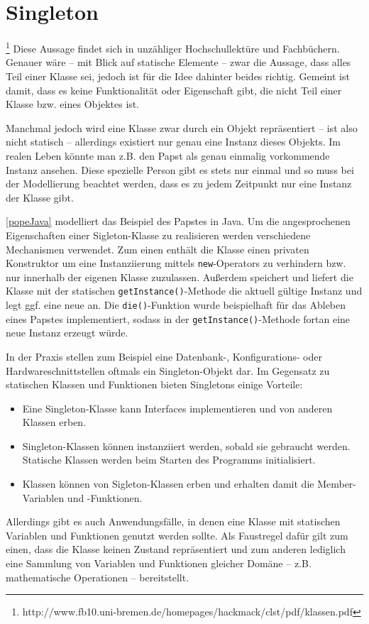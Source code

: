 \section{Singleton}
\footnote{http://www.fb10.uni-bremen.de/homepages/hackmack/clst/pdf/klassen.pdf} Diese Aussage findet sich in unzähliger Hochschullektüre und Fachbüchern. Genauer wäre -- mit Blick auf statische Elemente -- zwar die Aussage, dass alles Teil einer Klasse sei, jedoch ist für die Idee dahinter beides richtig. Gemeint ist damit, dass es keine Funktionalität oder Eigenschaft gibt, die nicht Teil einer Klasse bzw. eines Objektes ist.

Manchmal jedoch wird eine Klasse zwar durch ein Objekt repräsentiert -- ist also nicht statisch -- allerdings existiert nur genau eine Instanz dieses Objekts. Im realen Leben könnte man z.B. den Papst als genau einmalig vorkommende Instanz ansehen. Diese spezielle Person gibt es stets nur einmal und so muss bei der Modellierung beachtet werden, dass es zu jedem Zeitpunkt nur eine Instanz der Klasse gibt.


\autoref{popeJava} modelliert das Beispiel des Papstes in Java. Um die angesprochenen Eigenschaften einer Sigleton-Klasse zu realisieren werden verschiedene Mechanismen verwendet. Zum einen enthält die Klasse einen privaten Konstruktor um eine Instanziierung mittels \texttt{new}-Operators zu verhindern bzw. nur innerhalb der eigenen Klasse zuzulassen. Außerdem speichert und liefert die Klasse mit der statischen \texttt{getInstance()}-Methode die aktuell gültige Instanz und legt ggf. eine neue an. Die \texttt{die()}-Funktion wurde beispielhaft für das Ableben eines Papstes implementiert, sodass in der \texttt{getInstance()}-Methode fortan eine neue Instanz erzeugt würde.

In der Praxis stellen zum Beispiel eine Datenbank-, Konfigurations- oder Hardwareschnittstellen oftmals ein Singleton-Objekt dar. Im Gegensatz zu statischen Klassen und Funktionen bieten Singletons einige Vorteile:

\begin{itemize}
    \item Eine Singleton-Klasse kann Interfaces implementieren und von anderen Klassen erben.
    \item Singleton-Klassen können instanziiert werden, sobald sie gebraucht werden. Statische Klassen werden beim Starten des Programms initialisiert.
    \item Klassen können von Sigleton-Klassen erben und erhalten damit die Member-Variablen und -Funktionen.
\end{itemize}

Allerdings gibt es auch Anwendungsfälle, in denen eine Klasse mit statischen Variablen und Funktionen genutzt werden sollte. Als Faustregel dafür gilt zum einen, dass die Klasse keinen Zustand repräsentiert und zum anderen lediglich eine Sammlung von Variablen und Funktionen gleicher Domäne -- z.B. mathematische Operationen -- bereitstellt.